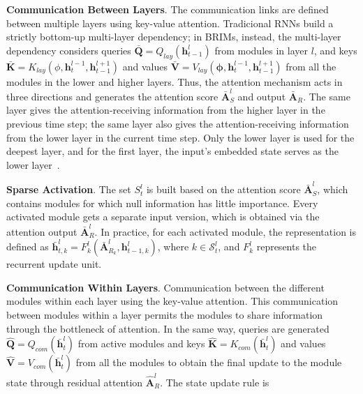 \textbf{Communication Between Layers}. The communication links are defined between
multiple layers using key-value attention. Tradicional RNNs build a strictly bottom-up multi-layer dependency; in BRIMs, instead, the multi-layer dependency considers queries $\mathbf{\bar{Q}} = Q_{lay}(\mathbf{h}^l_{t-1})$ from modules in layer $l$, and keys $\mathbf{\bar{K}} = K_{lay}(\phi, \mathbf{h}^{l-1}_t, \mathbf{h}^{l+1}_{t-1})$ and values $\mathbf{\bar{V}} = V_{lay}(\mathbf{\phi}, \mathbf{h}^{l-1}_t, \mathbf{h}^{l+1}_{t-1})$ from all the modules in the lower and higher layers. Thus, the attention mechanism acts in three directions and generates the attention score $\mathbf{\bar{A}}^l_S$ and output $\mathbf{\bar{A}}_R$. The same layer gives the attention-receiving information from the higher layer in the previous time step; the same layer also gives the attention-receiving information from the lower layer in the current time step. Only the lower layer is used for the deepest layer, and for the first layer, the input’s embedded state serves as the lower layer~\cite{mittal2020learning}.

\textbf{Sparse Activation}. The set $S^l_t$ is built based on the attention score $\mathbf{\bar{A}}^l_S$, which contains modules for which null information has little importance. Every activated module gets a separate input version, which is obtained via the attention output $\mathbf{\bar{A}}^l_R$. In practice, for each activated module, the representation is defined as $\mathbf{\bar{h}}_{t,k}^{l} = F_k^l(\mathbf{\bar{A}}_{R_k}^l, \textbf{h}_{t-1,k}^l)$, where $k \in \mathcal{S}_t^l$, and $F^l_k$ represents the recurrent update unit.



\textbf{Communication Within Layers}. Communication between the different modules within each layer using the key-value attention. This communication between modules within a layer permits the modules to share information through the bottleneck of attention. In the same way, queries are generated $\mathbf{\hat{Q}} = Q_{com}(\mathbf{\bar{h}}^l_t)$ from active modules and keys $\mathbf{\hat{K}} = K_{com}(\mathbf{\bar{h}}^l_t)$ and values $\mathbf{\hat{V}} = V_{com}(\mathbf{\bar{h}}^l_t)$ from all the modules to obtain the final update to the module state through residual attention $\mathbf{\hat{A}}^l_R$. The state update rule is

